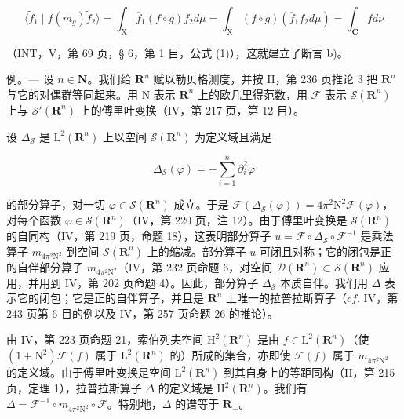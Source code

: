 \[
\langle \widetilde {f} _ {1} \mid f (m _ {g}) \widetilde {f} _ {2} \rangle = \int_ {\mathrm{X}} \overline {{f}} _ {1} (f \circ g) f _ {2} d \mu = \int_ {\mathrm{X}} (f \circ g) (\overline {{f}} _ {1} f _ {2} d \mu) = \int_ {\mathbf {C}} f d \nu
\]

（INT，V，第 69 页，§ 6，第 1 目，公式 (1)），这就建立了断言 b)。

例。--- 设 \(n \in \mathbf{N}\)。我们给 \(\mathbf{R}^{n}\) 赋以勒贝格测度，并按 II，第 236 页推论 3 把 \(\mathbf{R}^{n}\) 与它的对偶群等同起来。用 N 表示 \(\mathbf{R}^{n}\) 上的欧几里得范数，用 \(\mathcal{F}\) 表示 \(\mathcal{S}(\mathbf{R}^{n})\) 上与 \(\mathcal{S}'(\mathbf{R}^{n})\) 上的傅里叶变换（IV，第 217 页，第 12 目）。

设 \(\Delta_{\mathcal{S}}\) 是 \(\mathrm{L}^2 (\mathbf{R}^n)\) 上以空间 \(\mathcal{S}(\mathbf{R}^n)\) 为定义域且满足

\[
\Delta_ {\mathcal {S}} (\varphi) = - \sum_ {i = 1} ^ {n} \partial_ {i} ^ {2} \varphi
\]

的部分算子，对一切 \(\varphi\in\mathcal{S}(\mathbf{R}^{n})\) 成立。于是 \(\mathcal{F}(\Delta_{\mathcal{S}}(\varphi))=4\pi^{2}\mathrm{N}^{2}\mathcal{F}(\varphi)\)，对每个函数 \(\varphi\in\mathcal{S}(\mathbf{R}^{n})\)（IV，第 220 页，注 12）。由于傅里叶变换是 \(\mathcal{S}(\mathbf{R}^{n})\) 的自同构（IV，第 219 页，命题 18），这表明部分算子 \(u=\mathcal{F}\circ\Delta_{\mathcal{S}}\circ\mathcal{F}^{-1}\) 是乘法算子 \(m_{4\pi^{2}\mathrm{N}^{2}}\) 到空间 \(\mathcal{S}(\mathbf{R}^{n})\) 上的缩减。部分算子 \(u\) 可闭且对称；它的闭包是正的自伴部分算子 \(m_{4\pi^{2}\mathrm{N}^{2}}\)（IV，第 232 页命题 6，对空间 \(\mathcal{D}(\mathbf{R}^{n})\subset\mathcal{S}(\mathbf{R}^{n})\) 应用，并用到 IV，第 202 页命题 4）。因此，部分算子 \(\Delta_{\mathcal{S}}\) 本质自伴。我们用 \(\Delta\) 表示它的闭包；它是正的自伴算子，并且是 \(\mathbf{R}^{n}\) 上唯一的拉普拉斯算子（\(cf.\) IV，第 243 页第 6 目的例以及 IV，第 257 页命题 26 的推论）。

由 IV，第 223 页命题 21，索伯列夫空间 \(\mathrm{H}^2 (\mathbf{R}^n)\) 是由 \(f\in \mathrm{L}^2 (\mathbf{R}^n)\)（使 \((1 + \mathrm{N}^2)\mathcal{F}(f)\) 属于 \(\mathrm{L}^2 (\mathbf{R}^n)\) 的）所成的集合，亦即使 \(\mathcal{F}(f)\) 属于 \(m_{4\pi^2\mathrm{N}^2}\) 的定义域。由于傅里叶变换是空间 \(\mathrm{L}^2 (\mathbf{R}^n)\) 到其自身上的等距同构（II，第 215 页，定理 1），拉普拉斯算子 \(\Delta\) 的定义域是 \(\mathrm{H}^2 (\mathbf{R}^n)\)。我们有 \(\Delta = \mathcal{F}^{-1}\circ m_{4\pi^2\mathrm{N}^2}\circ \mathcal{F}\)。特别地，\(\Delta\) 的谱等于 \(\mathbf{R}_{+}\)。